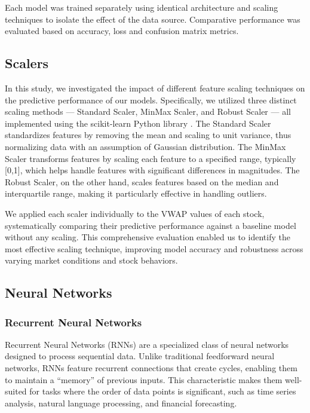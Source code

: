 \documentclass[10pt,a4paper]{article}
\begin{document}
Each model was trained separately using identical architecture and scaling techniques to isolate the effect of the data source. Comparative performance was evaluated based on accuracy, loss and confusion matrix metrics.


\subsection{Scalers}

In this study, we investigated the impact of different feature scaling techniques on the predictive performance of our models. Specifically, we utilized three distinct scaling methods — Standard Scaler, MinMax Scaler, and Robust Scaler — all implemented using the scikit-learn Python library \cite{scikit-learn}. 
The Standard Scaler standardizes features by removing the mean and scaling to unit variance, thus normalizing data with an assumption of Gaussian distribution. The MinMax Scaler transforms features by scaling each feature to a specified range, typically [0,1], which helps handle features with significant differences in magnitudes. The Robust Scaler, on the other hand, scales features based on the median and interquartile range, making it particularly effective in handling outliers.

We applied each scaler individually to the VWAP values of each stock, systematically comparing their predictive performance against a baseline model without any scaling. This comprehensive evaluation enabled us to identify the most effective scaling technique, improving model accuracy and robustness across varying market conditions and stock behaviors.

\subsection{Neural Networks}

\subsubsection{Recurrent Neural Networks}

Recurrent Neural Networks (RNNs) are a specialized class of neural networks designed to process sequential data. Unlike traditional feedforward neural networks, RNNs feature recurrent connections that create cycles, enabling them to maintain a ``memory'' of previous inputs. This characteristic makes them well-suited for tasks where the order of data points is significant, such as time series analysis, natural language processing, and financial forecasting.
\end{document}
